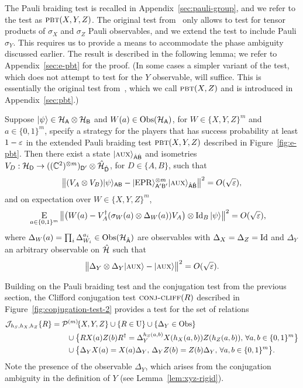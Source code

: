 The Pauli braiding test is recalled in Appendix~\ref{sec:pauli-group}, and we refer to the test as $\textsc{pbt}(X,Y,Z)$. The original test from~\cite{natarajan2016robust} only allows to test for tensor products of $\sigma_X$ and $\sigma_Z$ Pauli observables, and we extend the test to include Pauli $\sigma_Y$. This requires us to provide a means to accommodate the phase ambiguity discussed earlier. The result is described in the following lemma; we refer to Appendix~\ref{sec:e-pbt} for the proof. (In some cases a simpler variant of the test, which does not attempt to test for the $Y$ observable, will suffice. This is essentially the original test from~\cite{natarajan2016robust}, which we call $\textsc{pbt}(X,Z)$ and is introduced in Appendix~\ref{sec:pbt}.)

\begin{lemma}\label{lem:xyz-rigid}
Suppose $|\psi\rangle\in\mathcal{H}_{\textsf{A}}\otimes \mathcal{H}_{\textsf{B}}$ and $W(a) \in \mathrm{Obs}(\mathcal{H}_{\textsf{A}})$, for $W\in \{X,Y,Z\}^m$ and $a\in\{0,1\}^m$, specify a strategy for the players that has success probability at least $1-\varepsilon$ in the extended Pauli braiding test $\textsc{pbt}(X,Y,Z)$ described in Figure~\ref{fig:e-pbt}. 
Then there exist a state $|\textsc {aux}\rangle_{\hat{{\textsf{A}}}\hat{{\textsf{B}}}}$  and  isometries $V_D:\mathcal{H}_{\textsf{D}} \to ((\mathbb{C}^2)^{\otimes m})_{{\textsf{D}}'}  \otimes \hat{\mathcal{H}}_{\hat{{\textsf{D}}}}$, for $D\in\{A,B\}$, such that
$$\big\| (V_A \otimes V_B) |\psi\rangle_{{\textsf{AB}}} - |{\rm EPR}\rangle_{{\textsf{A}}'{\textsf{B}}'}^{\otimes m} |\textsc {aux}\rangle_{\hat{{\textsf{A}}}\hat{{\textsf{B}}}} \big\|^2 = O(\sqrt{\varepsilon}),$$
and on expectation over $W\in \{X,Y,Z\}^m$,
\begin{align}\label{eq:test-sigmay}
 \mathop{\textsc{E}}_{a\in\{0,1\}^m} \big\| \big(W(a) -V_A^\dagger (\sigma_W(a) \otimes \Delta_W(a)) V_A\big) \otimes \mathop{\rm Id}\nolimits_B |\psi\rangle \big\|^2 &= O(\sqrt{\varepsilon}),
\end{align}
where $\Delta_W(a) = \prod_i \Delta_{W_i}^{a_i} \in \mathrm{Obs}({\mathcal{H}}_{\hat{{\textsf{A}}}})$ are observables with $\Delta_{X}=\Delta_{Z}=\mathop{\rm Id}\nolimits$ and $\Delta_{Y}$ an arbitrary observable on $\hat{\mathcal{H}}$ such that 
	$$ \big\|\Delta_Y \otimes \Delta_Y |\textsc {aux}\rangle - |\textsc {aux}\rangle \big\|^2 = O(\sqrt{\varepsilon}).$$
\end{lemma} 

Building on the Pauli braiding test and the conjugation test from the previous section, the Clifford conjugation test $\textsc{conj-cliff}(R)$ described in Figure~\ref{fig:conjugation-test-2} 
 provides a test for the set of relations 
\begin{align}
\mathcal{J}\!_{h_S,h_X,h_Z}\{R\} &= \mathcal{P}^{(m)}\!\{X,Y,Z\}  \cup \{R\in \mathrm{U}\} \cup \{\Delta_Y\in\mathrm{Obs}\}\notag\\
&\qquad \cup \big\{ R X(a)Z(b)R^\dagger = \Delta_Y^{h_S(a,b)}X(h_X(a,b))Z(h_Z(a,b)),\,\forall a,b\in\{0,1\}^m\big\} \notag\\
&\qquad \cup \big\{ \Delta_Y X(a) = X(a)\Delta_Y,\,\Delta_Y Z(b)=Z(b)\Delta_Y,\,\forall a,b\in\{0,1\}^m\big\}.\label{eq:def-hr}
\end{align}
Note the presence of the observable $\Delta_Y$, which arises from the conjugation ambiguity in the definition of $Y$ (see Lemma~\ref{lem:xyz-rigid}). 

